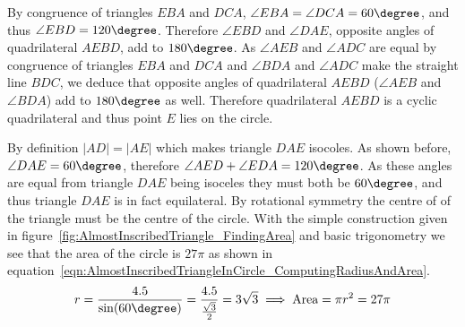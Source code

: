 By congruence of triangles $EBA$ and $DCA$, $\angle EBA = \angle DCA = 60\degree$, and thus $\angle EBD = 120\degree$. Therefore $\angle EBD$ and $\angle DAE$, opposite angles of quadrilateral $AEBD$, add to $180\degree$. As $\angle AEB$ and $\angle ADC$ are equal by congruence of triangles $EBA$ and $DCA$ and $\angle BDA$ and $\angle ADC$ make the straight line $BDC$, we deduce that opposite angles of quadrilateral $AEBD$ ($\angle AEB$ and $\angle BDA$) add to $180\degree$ as well. Therefore quadrilateral $AEBD$ is a cyclic quadrilateral and thus point $E$ lies on the circle.

By definition $|AD| = |AE|$ which makes triangle $DAE$ isocoles. As shown before, $\angle DAE = 60\degree$, therefore $\angle AED + \angle EDA = 120\degree$. As these angles are equal from triangle $DAE$ being isoceles they must both be $60\degree$, and thus triangle $DAE$ is in fact equilateral. By rotational symmetry the centre of of the triangle must be the centre of the circle. With the simple construction given in figure~\ref{fig:AlmostInscribedTriangle_FindingArea} and basic trigonometry we see that the area of the circle is $27\pi$ as shown in equation~\eqref{eqn:AlmostInscribedTriangleInCircle_ComputingRadiusAndArea}.
\begin{equation}
	r = \frac{4.5}{\sin(60\degree)} = \frac{4.5}{\frac{\sqrt{3}}{2}} = 3\sqrt{3} \implies \text{Area} = \pi r^2 = 27\pi
	\label{eqn:AlmostInscribedTriangleInCircle_ComputingRadiusAndArea}
\end{equation}

